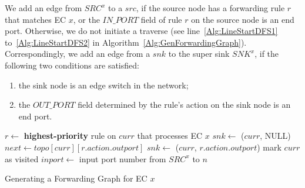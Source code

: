 We add an edge from $SRC^x$ to a $src$, if the source node has a forwarding rule $r$ that matches EC $x$, or the $IN\_PORT$ field of rule $r$ on the source node is an end port.
Otherwise, we do not initiate a traverse (see line~\ref{Alg:LineStartDFS1} to~\ref{Alg:LineStartDFS2} in Algorithm~\ref{Alg:GenForwardingGraph}).
Correspondingly, we add an edge from a $snk$ to the super sink $SNK^x$, if the following two conditions are satisfied:
\begin{enumerate}
\item the sink node is an edge switch in the network;
\item the $OUT\_PORT$ field determined by the rule's action on the sink node is an end port.
\end{enumerate}

\begin{algorithm}[h]
\DontPrintSemicolon
{}
 {
         {
                $r \gets$ \textbf{highest-priority} rule on $curr$ that processes EC $x$\;
                 {\label{Alg:LineDropPath1}
                        $snk \gets$ ($curr$, NULL)\;
                        \;
                        \KwRet\;
                }\label{Alg:LineDropPath2}
                $next \gets topo[curr][r.action.outport]$\;
                 {\label{Alg:LineForwardPath1}
                        $snk \gets$ ($curr$, $r.action.outport$)\;
                        \;
                        \KwRet\;
                }\label{Alg:LineForwardPath2}
                mark $curr$ as visited\;
                \;
        }
}\;
 {\label{Alg:LineStartDFS1}
         {
                $inport \gets$ input port number from $SRC^x$ to $n$\;
                \;
        }
}\label{Alg:LineStartDFS2}
\caption{Generating a Forwarding Graph for EC $x$\label{Alg:GenForwardingGraph}}
\end{algorithm}


